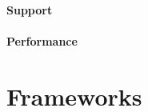 \documentclass[a4paper]{article}
\begin{document}
\paragraph{Support}%
% 
% 
\paragraph{Performance}%
% 

\section{Frameworks} %
\label{sec:frameworks}
\end{document}
